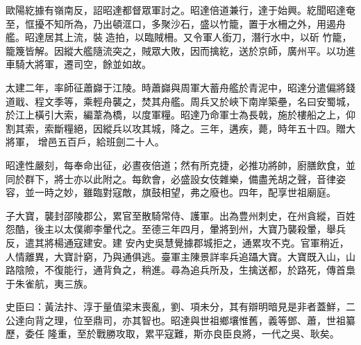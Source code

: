 \begin{pinyinscope}
 歐陽紇據有嶺南反，詔昭達都督眾軍討之。昭達倍道兼行，達于始興。紇聞昭達奄至，恇擾不知所為，乃出頓洭口，多聚沙石，盛以竹籠，置于水柵之外，用遏舟艦。昭達居其上流，裝造拍，以臨賊柵。又令軍人銜刀，潛行水中，以斫
 竹籠，籠篾皆解。因縱大艦隨流突之，賊眾大敗，因而擒紇，送於京師，廣州平。以功進車騎大將軍，遷司空，餘並如故。



 太建二年，率師征蕭巋于江陵。時蕭巋與周軍大蓄舟艦於青泥中，昭達分遣偏將錢道戢、程文季等，乘輕舟襲之，焚其舟艦。周兵又於峽下南岸築壘，名曰安蜀城，於江上橫引大索，編葦為橋，以度軍糧。昭達乃命軍士為長戟，施於樓船之上，仰割其索，索斷糧絕，因縱兵以攻其城，降之。三年，遘疾，薨，時年五十四。贈大將軍，
 增邑五百戶，給班劍二十人。



 昭達性嚴刻，每奉命出征，必晝夜倍道；然有所克捷，必推功將帥，廚膳飲食，並同於群下，將士亦以此附之。每飲會，必盛設女伎雜樂，備盡羌胡之聲，音律姿容，並一時之妙，雖臨對寇敵，旗鼓相望，弗之廢也。四年，配享世祖廟庭。



 子大寶，襲封邵陵郡公，累官至散騎常侍、護軍。出為豊州刺史，在州貪縱，百姓怨酷，後主以太僕卿李暈代之。至德三年四月，暈將到州，大寶乃襲殺暈，舉兵反，遣其將楊通寇建安。建
 安內史吳慧覺據郡城拒之，通累攻不克。官軍稍近，人情離異，大寶計窮，乃與通俱逃。臺軍主陳景詳率兵追躡大寶。大寶既入山，山路陰險，不復能行，通背負之，稍進。尋為追兵所及，生擒送都，於路死，傳首梟于朱雀航，夷三族。



 史臣曰：黃法抃、淳于量值梁末喪亂，劉、項未分，其有辯明暗見是非者蓋鮮，二公達向背之理，位至鼎司，亦其智也。昭達與世祖鄉壤惟舊，義等鄧、蕭，世祖纂歷，委任
 隆重，至於戰勝攻取，累平寇難，斯亦良臣良將，一代之吳、耿矣。






\end{pinyinscope}